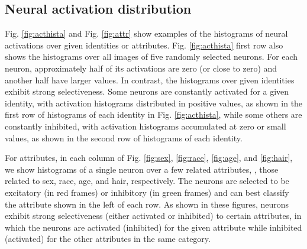 \documentclass[10pt,twocolumn,letterpaper]{article}
\begin{document}
\subsection{Neural activation distribution}
Fig. \ref{fig:acthista} and Fig. \ref{fig:attr} show examples of the histograms of neural activations over given identities or attributes. Fig. \ref{fig:acthista} first row also shows the histograms over all images of five randomly selected neurons. For each neuron, approximately half of its activations are zero (or close to zero) and another half have larger values. In contrast, the histograms over given identities exhibit strong selectiveness. Some neurons are constantly activated for a given identity, with activation histograms distributed in positive values, as shown in the first row of histograms of each identity in Fig. \ref{fig:acthista}, while some others are constantly inhibited, with activation histograms accumulated at zero or small values, as shown in the second row of histograms of each identity.

For attributes, in each column of Fig. \ref{fig:sex}, \ref{fig:race}, \ref{fig:age}, and \ref{fig:hair}, we show histograms of a single neuron over a few related attributes, \ie, those related to sex, race, age, and hair, respectively. The neurons are selected to be excitatory (in red frames) or inhibitory (in green frames) and can best classify the attribute shown in the left of each row. As shown in these figures, neurons exhibit strong selectiveness (either activated or inhibited) to certain attributes, in which the neurons are activated (inhibited) for the given attribute while inhibited (activated) for the other attributes in the same category.
\end{document}
